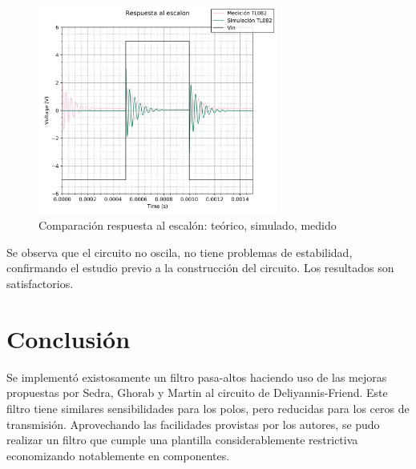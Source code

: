 \begin{figure}[H]
    \centering
    \includegraphics[width=0.7\textwidth]{../Ex3/Resources/medicrespesc.png}
    \caption{Comparación respuesta al escalón: teórico, simulado, medido}
    \label{medicrespesc}
\end{figure}

Se observa que el circuito no oscila, no tiene problemas de estabilidad, confirmando el estudio previo a la construcción del circuito. Los resultados son satisfactorios.

\section{Conclusión}
Se implementó existosamente un filtro pasa-altos haciendo uso de las mejoras propuestas por Sedra, Ghorab y Martin al circuito de Deliyannis-Friend. Este filtro tiene similares sensibilidades para los polos, pero reducidas para los ceros de transmisión. Aprovechando las facilidades provistas por los autores, se pudo realizar un filtro que cumple una plantilla considerablemente restrictiva economizando notablemente en componentes.%